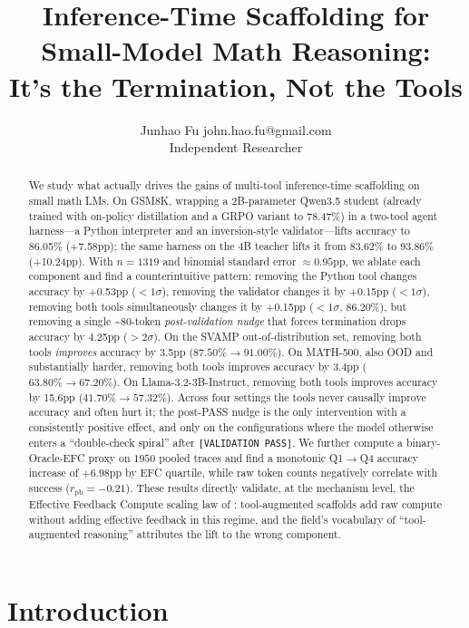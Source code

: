 \documentclass[10pt]{article}
\title{Inference-Time Scaffolding for Small-Model Math Reasoning:\\
It's the Termination, Not the Tools}
\author{\name Junhao Fu \email john.hao.fu@gmail.com \\
        \addr Independent Researcher}
\begin{document}
\maketitle

\begin{abstract}
We study what actually drives the gains of multi-tool inference-time scaffolding on small math LMs. On GSM8K, wrapping a 2B-parameter Qwen3.5 student (already trained with on-policy distillation and a GRPO variant to 78.47\%) in a two-tool agent harness---a Python interpreter and an inversion-style validator---lifts accuracy to 86.05\% (+7.58pp); the same harness on the 4B teacher lifts it from 83.62\% to 93.86\% (+10.24pp). With $n{=}1319$ and binomial standard error $\approx 0.95$pp, we ablate each component and find a counterintuitive pattern: removing the Python tool changes accuracy by +0.53pp ($<\!1\sigma$), removing the validator changes it by +0.15pp ($<\!1\sigma$), removing both tools simultaneously changes it by +0.15pp ($<\!1\sigma$, $86.20\%$), but removing a single \textasciitilde 80-token \emph{post-validation nudge} that forces termination drops accuracy by 4.25pp ($>\!2\sigma$). On the SVAMP out-of-distribution set, removing both tools \emph{improves} accuracy by 3.5pp ($87.50\%\!\to\!91.00\%$). On MATH-500, also OOD and substantially harder, removing both tools improves accuracy by 3.4pp ($63.80\%\!\to\!67.20\%$). On Llama-3.2-3B-Instruct, removing both tools improves accuracy by 15.6pp ($41.70\%\!\to\!57.32\%$). Across four settings the tools never causally improve accuracy and often hurt it; the post-PASS nudge is the only intervention with a consistently positive effect, and only on the configurations where the model otherwise enters a ``double-check spiral'' after \texttt{[VALIDATION PASS]}. We further compute a binary-Oracle-EFC proxy on $1950$ pooled traces and find a monotonic Q1$\to$Q4 accuracy increase of $+6.98$pp by EFC quartile, while raw token counts negatively correlate with success ($r_\text{pb}{=}{-}0.21$). These results directly validate, at the mechanism level, the Effective Feedback Compute scaling law of \citet{efc2026}: tool-augmented scaffolds add raw compute without adding effective feedback in this regime, and the field's vocabulary of ``tool-augmented reasoning'' attributes the lift to the wrong component.
\end{abstract}

\section{Introduction}
\end{document}
